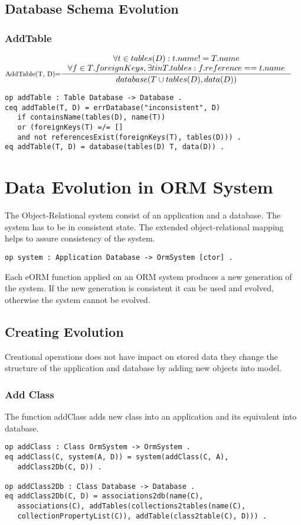\documentclass[11pt]{article}
\begin{document}
\subsection{Database Schema Evolution}
\subsubsection{AddTable}

$
\inference[AddTable(T, D)=]{\forall t \in tables(D) : t.name != T.name\\
	\forall f \in T.foreignKeys, \exists t in T.tables : f.reference == t.name
}{database(T \cup tables(D), data(D))}
$

\begin{verbatim}
op addTable : Table Database -> Database .
ceq addTable(T, D) = errDatabase("inconsistent", D) 
   if containsName(tables(D), name(T)) 
   or (foreignKeys(T) =/= [] 
   and not referencesExist(foreignKeys(T), tables(D))) .
eq addTable(T, D) = database(tables(D) T, data(D)) .
\end{verbatim}


\section{Data Evolution in ORM System}
The Object-Relational system consist of an application and a database. The system has to be in consistent state. The extended object-relational mapping helps to assure consistency of the system.
\begin{verbatim}
op system : Application Database -> OrmSystem [ctor] .
\end{verbatim}
Each eORM function applied on an ORM system produces a new generation of the system. If the new generation is consistent it can be used and evolved, otherwise the system cannot be evolved.

\subsection{Creating Evolution}
Creational operations does not have impact on stored data they change the structure of the application and database by adding new objects into model.

\subsubsection{Add Class}
The function addClass adds new class into an application and its equivalent into database. 
\begin{verbatim}
op addClass : Class OrmSystem -> OrmSystem .
eq addClass(C, system(A, D)) = system(addClass(C, A), 
   addClass2Db(C, D)) .

op addClass2Db : Class Database -> Database .
eq addClass2Db(C, D) = associations2db(name(C), 
   associations(C), addTables(collections2tables(name(C), 
   collectionPropertyList(C)), addTable(class2table(C), D))) .
\end{verbatim}
\end{document}
